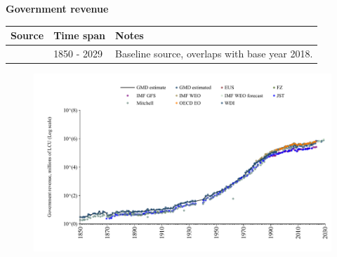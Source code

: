 \documentclass[12pt,a4paper,landscape]{article}
\begin{document}
\begin{adjustbox}{max totalsize={\paperwidth}{\paperheight},center}
\begin{minipage}[t][\textheight][t]{\textwidth}
\vspace*{0.5cm}
{}
\begin{center}
{\Large\bfseries Government revenue}
\end{center}
\vspace{0.5cm}
\begin{table}[H]
\centering
\small
\begin{tabular}{|l|l|l|}
\hline
\textbf{Source} & \textbf{Time span} & \textbf{Notes} \\
\hline
\rowcolor{white}\cite{GMD_estimated}& 1850 - 2029 &Baseline source, overlaps with base year 2018. \\
\hline
\end{tabular}
\end{table}
\begin{figure}[H]
\centering
\includegraphics[width=\textwidth,height=0.6\textheight,keepaspectratio]{graphs/ESP_govrev.pdf}
\end{figure}
\end{minipage}
\end{adjustbox}
\end{document}
